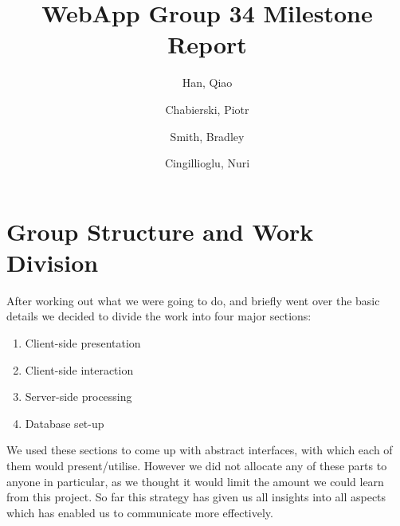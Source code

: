 \documentclass[11pt,a4paper]{article}
\begin{document}
\title{WebApp Group 34 Milestone Report}
\author{
  Han, Qiao\\
  \and
  Chabierski, Piotr\\
  \and
  Smith, Bradley\\
  \and
  Cingillioglu, Nuri\\
}

\maketitle

\section{Group Structure and Work Division}
After working out what we were going to do, and briefly went over the basic details we decided to divide the work into four major sections: 

\begin{enumerate}
  \item Client-side presentation
  \item Client-side interaction
  \item Server-side processing
  \item Database set-up
  \end{enumerate} 

\noindent We used these sections to come up with abstract interfaces, with which each of them would present/utilise. However we did not allocate any of these parts to anyone in particular, as we thought it would limit the amount we could learn from this project. So far this strategy has given us all insights into all aspects which has enabled us to communicate more effectively.
\end{document}
